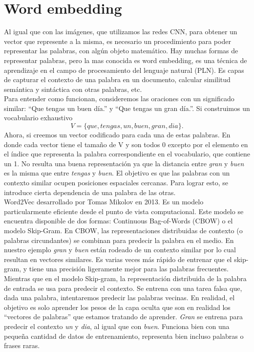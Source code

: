 \section{Word embedding}
Al igual que con las imágenes, que utilizamos las redes CNN, para obtener un vector que represente a la misma, es necesario un procedimiento para poder representar las palabras, con algún objeto matemático. Hay muchas formas de representar palabras, pero la mas conocida es word embedding, es una técnica de aprendizaje en el campo de procesamiento del lenguaje natural (PLN). Es capas de capturar el contexto de una palabra en un documento, calcular similitud semántica y sintáctica con otras palabras, etc.\\

Para entender como funcionan, consideremos las oraciones con un significado similar: ``Que tengas un buen día.'' y ``Que tengas un gran día.''. Si construimos un vocabulario exhaustivo 
 \[ V = \{que, tengas, un, buen, gran, dia\}. \]
 Ahora, si creemos un vector codificado para cada una de estas palabras. En donde cada vector tiene el tamaño de V y son todos 0 excepto por el elemento en el índice que representa la palabra correspondiente en el vocabulario, que contiene un 1. No resulta una buena representación ya que la distancia entre \textit{gran} y \textit{buen} es la misma que entre \textit{tengas} y \textit{buen}.  El objetivo es que las palabras con un contexto similar ocupen posiciones espaciales cercanas. Para lograr esto, se introduce cierta dependencia de una palabra de las otras.\\

Word2Vec \cite{mikolov2013distributed} desarrollado por Tomas Mikolov en 2013. Es un modelo particularmente eficiente desde el punto de vista computacional. Este modelo se encuentra disponible de dos formas: Continuous Bag-of-Words (CBOW) o el modelo Skip-Gram. En CBOW, las representaciones distribuidas de contexto (o palabras circundantes) se combinan para predecir la palabra en el medio. En nuestro ejemplo \textit{gran} y \textit{buen} están rodeado de un contexto similar por lo cual resultan en vectores similares. Es varias veces más rápido de entrenar que el skip-gram, y tiene una precisión ligeramente mejor para las palabras frecuentes. Mientras que en el modelo Skip-gram, la representación distribuida de la palabra de entrada se usa para predecir el contexto. Se entrena con una tarea falsa que, dada una palabra, intentaremos predecir las palabras vecinas. En realidad, el objetivo es solo aprender los pesos de la capa oculta que son en realidad los ``vectores de palabras'' que estamos tratando de aprender. \textit{Gran} se entrena para predecir el contexto \textit{un} y  \textit{dia}, al igual que con \textit{buen}. Funciona bien con una pequeña cantidad de datos de entrenamiento, representa bien incluso palabras o frases raras.

